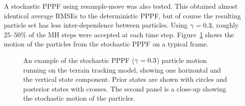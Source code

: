 \documentclass{article}
\begin{document}
A stochastic PPPF using resample-move was also tested. This obtained almost identical average RMSEs to the deterministic PPPF, but of course the resulting particle set has less inter-dependence between particles. Using $\gamma=0.3$, roughly $25$--$50\%$ of the MH steps were accepted at each time step. Figure~\ref{fig:drone_example_frame_stochastic} shows the motion of the particles from the stochastic PPPF on a typical frame.
%
\begin{figure}
\centering
{}
\caption{An example of the stochastic PPPF ($\gamma=0.3$) particle motion running on the terrain tracking model, showing one horizontal and the vertical state component. Prior states are shown with circles and posterior states with crosses. The second panel is a close-up showing the stochastic motion of the particles.}
\label{fig:drone_example_frame_stochastic}
\end{figure}
\end{document}
